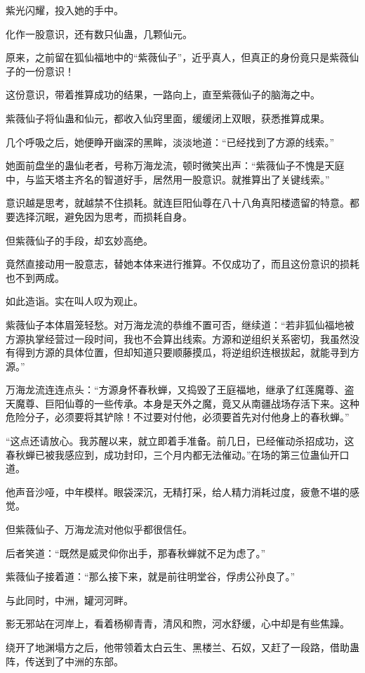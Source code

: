 \begin{this_body}
紫光闪耀，投入她的手中。

化作一股意识，还有数只仙蛊，几颗仙元。

原来，之前留在狐仙福地中的“紫薇仙子”，近乎真人，但真正的身份竟只是紫薇仙子的一份意识！

这份意识，带着推算成功的结果，一路向上，直至紫薇仙子的脑海之中。

紫薇仙子将仙蛊和仙元，都收入仙窍里面，缓缓闭上双眼，获悉推算成果。

几个呼吸之后，她便睁开幽深的黑眸，淡淡地道：“已经找到了方源的线索。”

她面前盘坐的蛊仙老者，号称万海龙流，顿时微笑出声：“紫薇仙子不愧是天庭中，与监天塔主齐名的智道好手，居然用一股意识。就推算出了关键线索。”

意识越是思考，就越禁不住损耗。就连巨阳仙尊在八十八角真阳楼遗留的特意。都要选择沉眠，避免因为思考，而损耗自身。

但紫薇仙子的手段，却玄妙高绝。

竟然直接动用一股意志，替她本体来进行推算。不仅成功了，而且这份意识的损耗也不到两成。

如此造诣。实在叫人叹为观止。

紫薇仙子本体眉笼轻愁。对万海龙流的恭维不置可否，继续道：“若非狐仙福地被方源执掌经营过一段时间，我也不会算出线索。方源和逆组织关系密切，我虽然没有得到方源的具体位置，但却知道只要顺藤摸瓜，将逆组织连根拔起，就能寻到方源。”

万海龙流连连点头：“方源身怀春秋蝉，又捣毁了王庭福地，继承了红莲魔尊、盗天魔尊、巨阳仙尊的一些传承。本身是天外之魔，竟又从南疆战场存活下来。这种危险分子，必须要将其铲除！不过要对付他，必须要首先对付他身上的春秋蝉。”

“这点还请放心。我苏醒以来，就立即着手准备。前几日，已经催动杀招成功，这春秋蝉已被我感应到，成功封印，三个月内都无法催动。”在场的第三位蛊仙开口道。

他声音沙哑，中年模样。眼袋深沉，无精打采，给人精力消耗过度，疲惫不堪的感觉。

但紫薇仙子、万海龙流对他似乎都很信任。

后者笑道：“既然是威灵仰你出手，那春秋蝉就不足为虑了。”

紫薇仙子接着道：“那么接下来，就是前往明堂谷，俘虏公孙良了。”

与此同时，中洲，罐河河畔。

影无邪站在河岸上，看着杨柳青青，清风和煦，河水舒缓，心中却是有些焦躁。

绕开了地渊塌方之后，他带领着太白云生、黑楼兰、石奴，又赶了一段路，借助蛊阵，传送到了中洲的东部。


\end{this_body}
